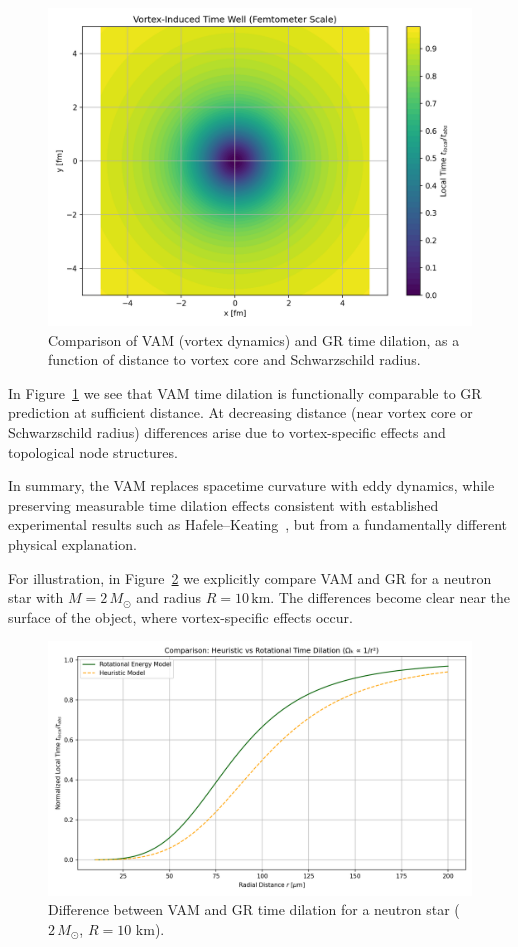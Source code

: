 \begin{figure}[ht!]
    \centering
    \includegraphics[width=0.7\linewidth]{02-RadialProfileOfLocalTimeDilation_Vortex-Induced_Time_Well}
    \caption{Comparison of VAM (vortex dynamics) and GR time dilation, as a function of distance to vortex core and Schwarzschild radius.}
    \label{fig:vergelijking_VAMGR}
\end{figure}

In Figure~\ref{fig:vergelijking_VAMGR} we see that VAM time dilation is functionally comparable to GR prediction at sufficient distance. At decreasing distance (near vortex core or Schwarzschild radius) differences arise due to vortex-specific effects and topological node structures.

In summary, the VAM replaces spacetime curvature with eddy dynamics, while preserving measurable time dilation effects consistent with established experimental results such as Hafele–Keating~\cite{hafele1972around}, but from a fundamentally different physical explanation.

For illustration, in Figure~\ref{fig:comparisonVAMGR} we explicitly compare VAM and GR for a neutron star with $M = 2\,M_\odot$ and radius $R = 10\,\text{km}$. The differences become clear near the surface of the object, where vortex-specific effects occur.

\begin{figure}[ht!]
    \centering
    \includegraphics[width=0.7\linewidth]{04-RotationalVsHeuristicTimeDilation}
    \caption{Difference between VAM and GR time dilation for a neutron star ($2\,M_\odot$, $R=10$ km).}
    \label{fig:comparisonVAMGR}
\end{figure}

